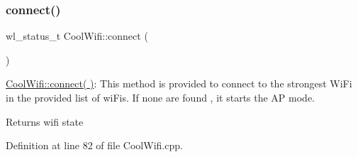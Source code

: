 \subsubsection{\texorpdfstring{connect()}{connect()}}
{\footnotesize\ttfamily wl\+\_\+status\+\_\+t Cool\+Wifi\+::connect (\begin{DoxyParamCaption}{ }\end{DoxyParamCaption})}

\hyperlink{class_cool_wifi_ad060353050f40d032a2dbf9e54a768bf}{Cool\+Wifi\+::connect( )}\+: This method is provided to connect to the strongest Wi\+Fi in the provided list of wi\+Fis. If none are found , it starts the AP mode.

\begin{DoxyReturn}{Returns}
wifi state 
\end{DoxyReturn}


Definition at line 82 of file Cool\+Wifi.\+cpp.


